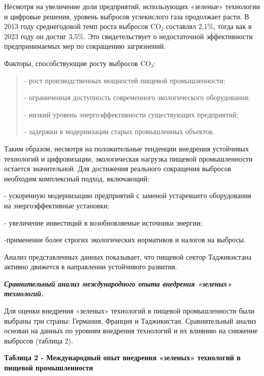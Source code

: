 Несмотря на увеличение доли предприятий, использующих «зеленые»
технологии и цифровые решения, уровень выбросов углекислого газа
продолжает расти. В 2013 году среднегодовой темп роста выбросов CO₂
составлял 2,1\%, тогда как в 2023 году он достиг 3,5\%. Это
свидетельствует о недостаточной эффективности предпринимаемых мер по
сокращению загрязнений.

Факторы, способствующие росту выбросов CO₂:

\begin{quote}
- рост производственных мощностей пищевой промышленности;

- ограниченная доступность современного экологического оборудования;

- низкий уровень энергоэффективности существующих предприятий;

- задержки в модернизации старых промышленных объектов.
\end{quote}

Таким образом, несмотря на положительные тенденции внедрения устойчивых
технологий и цифровизации, экологическая нагрузка пищевой промышленности
остается значительной. Для достижения реального сокращения выбросов
необходим комплексный подход, включающий:

- ускоренную модернизацию предприятий с заменой устаревшего оборудования
на энергоэффективные установки;

- увеличение инвестиций в возобновляемые источники энергии;

-применение более строгих экологических нормативов и налогов на выбросы.

Анализ представленных данных показывает, что пищевой сектор Таджикистана
активно движется в направлении устойчивого развития.

\emph{{\bfseries Сравнительный анализ международного опыта внедрения
«зеленых» технологий.}}

Для оценки внедрения «зеленых» технологий в пищевой промышленности были
выбраны три страны: Германия, Франция и Таджикистан. Сравнительный
анализ основан на данных по уровням внедрения технологий и их влиянию на
снижение выбросов (таблица 2).

{\bfseries Таблица 2 - Международный опыт внедрения «зеленых» технологий в
пищевой промышленности}

